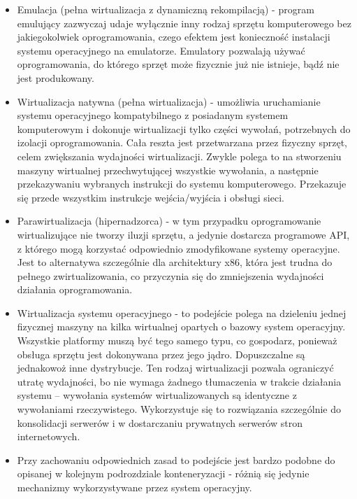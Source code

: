 \documentclass[10pt,a4paper,titlepage,twoside]{report}
\begin{document}
\begin{itemize}
	\item Emulacja (pełna wirtualizacja z dynamiczną rekompilacją) - program emulujący zazwyczaj udaje wyłącznie inny rodzaj sprzętu komputerowego bez jakiegokolwiek oprogramowania, czego efektem jest konieczność instalacji systemu operacyjnego na emulatorze. Emulatory pozwalają używać oprogramowania, do którego sprzęt może fizycznie już nie istnieje, bądź nie jest produkowany.
	\item Wirtualizacja natywna (pełna wirtualizacja) - umożliwia uruchamianie systemu operacyjnego kompatybilnego z posiadanym systemem komputerowym i dokonuje wirtualizacji tylko części wywołań, potrzebnych do izolacji oprogramowania. Cała reszta jest przetwarzana przez fizyczny sprzęt, celem zwiększania wydajności wirtualizacji. Zwykle polega to na stworzeniu maszyny wirtualnej przechwytującej wszystkie wywołania, a następnie przekazywaniu wybranych instrukcji do systemu komputerowego. Przekazuje się przede wszystkim instrukcje wejścia/wyjścia i obsługi sieci.
	\item Parawirtualizacja (hipernadzorca) - w tym przypadku oprogramowanie wirtualizujące nie tworzy iluzji sprzętu, a jedynie dostarcza programowe API, z którego mogą korzystać odpowiednio zmodyfikowane systemy operacyjne. Jest to alternatywa szczególnie dla architektury x86, która jest trudna do pełnego zwirtualizowania, co przyczynia się do zmniejszenia wydajności działania oprogramowania.
	\item Wirtualizacja systemu operacyjnego - to podejście polega na dzieleniu jednej fizycznej maszyny na kilka wirtualnej opartych o bazowy system operacyjny. Wszystkie platformy muszą być tego samego typu, co gospodarz, ponieważ obsługa sprzętu jest dokonywana przez jego jądro. Dopuszczalne są jednakowoż inne dystrybucje. Ten rodzaj wirtualizacji pozwala ograniczyć utratę wydajności, bo nie wymaga żadnego tłumaczenia w trakcie działania systemu – wywołania systemów wirtualizowanych są identyczne z wywołaniami rzeczywistego. Wykorzystuje się to rozwiązania szczególnie do konsolidacji serwerów i w dostarczaniu prywatnych serwerów stron internetowych.
	\item Przy zachowaniu odpowiednich zasad to podejście jest bardzo podobne do opisanej w kolejnym podrozdziale konteneryzacji - różnią się jedynie mechanizmy wykorzystywane przez system operacyjny.
\end{itemize}
\end{document}
